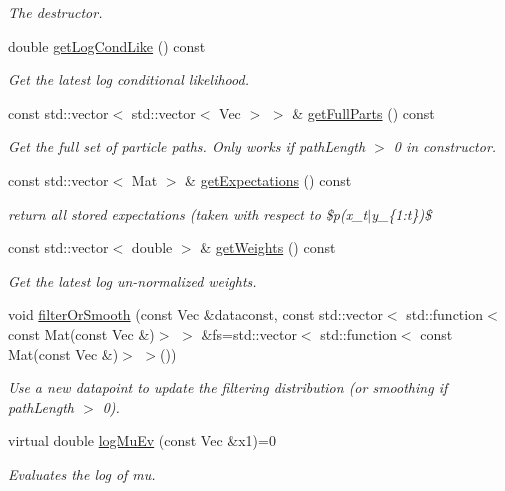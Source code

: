 \begin{DoxyCompactItemize}
\begin{DoxyCompactList}\small\item\em The destructor. \end{DoxyCompactList}\item 
double \hyperlink{classAPFFilter_af9a5210f2927616dd6c82705d203b012}{get\+Log\+Cond\+Like} () const 
\begin{DoxyCompactList}\small\item\em Get the latest log conditional likelihood. \end{DoxyCompactList}\item 
const std\+::vector$<$ std\+::vector$<$ Vec $>$ $>$ \& \hyperlink{classAPFFilter_aa2ec5f04285cd1821f21ee85dcf50e3f}{get\+Full\+Parts} () const 
\begin{DoxyCompactList}\small\item\em Get the full set of particle paths. Only works if path\+Length $>$ 0 in constructor. \end{DoxyCompactList}\item 
const std\+::vector$<$ Mat $>$ \& \hyperlink{classAPFFilter_a84281845b2986f246fc132d13fd33e3d}{get\+Expectations} () const 
\begin{DoxyCompactList}\small\item\em return all stored expectations (taken with respect to \$p(x\+\_\+t$\vert$y\+\_\+\{1\+:t\})\$ \end{DoxyCompactList}\item 
const std\+::vector$<$ double $>$ \& \hyperlink{classAPFFilter_a5e552b59cc1e2adc56b06ea7925df51f}{get\+Weights} () const 
\begin{DoxyCompactList}\small\item\em Get the latest log un-\/normalized weights. \end{DoxyCompactList}\item 
void \hyperlink{classAPFFilter_adc7ee7fed78dd93309784378523e0399}{filter\+Or\+Smooth} (const Vec \&dataconst, const std\+::vector$<$ std\+::function$<$ const Mat(const Vec \&)$>$ $>$ \&fs=std\+::vector$<$ std\+::function$<$ const Mat(const Vec \&)$>$ $>$())
\begin{DoxyCompactList}\small\item\em Use a new datapoint to update the filtering distribution (or smoothing if path\+Length $>$ 0). \end{DoxyCompactList}\item 
virtual double \hyperlink{classAPFFilter_af3d1501c147477ce1128b221f7b608fd}{log\+Mu\+Ev} (const Vec \&x1)=0
\begin{DoxyCompactList}\small\item\em Evaluates the log of mu. \end{DoxyCompactList}\item 

\end{DoxyCompactItemize}
